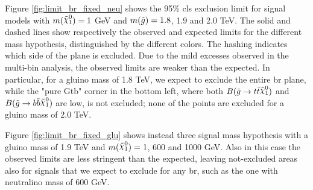 Figure \ref{fig:limit_br_fixed_neu} shows the 95\% \gls{cls} exclusion limit for signal models with $m(\ninoone) = 1$ GeV and 
$m(\tilde{g}) = 1.8$, 1.9 and 2.0 TeV. The solid and dashed lines show respectively the observed and expected limits for the different 
mass hypothesis, distinguished by the different colors. The hashing indicates which side of the plane is excluded. 
Due to the mild excesses observed in the multi-bin analysis, the observed limits are weaker than the expected. 
In particular, for a gluino mass of 1.8 TeV, we expect to exclude the entire \gls{br} plane, while the "pure Gtb" corner 
in the bottom left, where both $B(\gluino \to t \bar{t} \ninoone)$ and $B(\gluino \to b \bar{b} \ninoone)$ are low, 
is not excluded; none of the points are excluded for a gluino mass of 2.0 TeV. 

Figure \ref{fig:limit_br_fixed_glu} shows instead three signal mass hypothesis with a gluino mass of 1.9 TeV 
and $m(\ninoone) = 1$, 600 and 1000 GeV. Also in this case the observed limits are less stringent than the expected, leaving 
not-excluded areas also for signals that we expect to exclude for any \gls{br}, such as the one with neutralino mass of 600 GeV.


